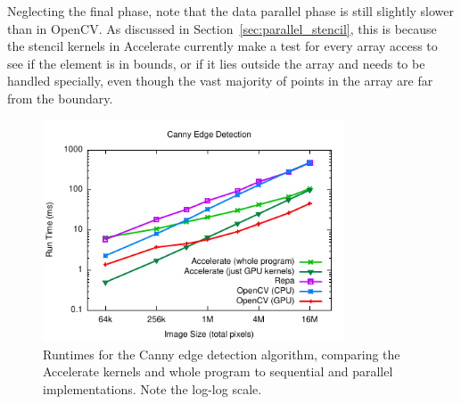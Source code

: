Neglecting the final phase, note that the data parallel phase is still slightly
slower than in OpenCV. As discussed in Section~\ref{sec:parallel_stencil}, this
is because the stencil kernels in Accelerate currently make a test for every
array access to see if the element is in bounds, or if it lies outside the array
and needs to be handled specially, even though the vast majority of points in
the array are far from the boundary.

\begin{figure}
    \begin{center}
        \includegraphics[width=0.8\textwidth]{images/results/canny/canny}
    \end{center}
    \caption[Canny edge detection benchmarks]{Runtimes for the Canny edge
        detection algorithm, comparing the Accelerate kernels and whole program
        to sequential and parallel implementations. Note the log-log scale.}
    \label{fig:canny}
\end{figure}

